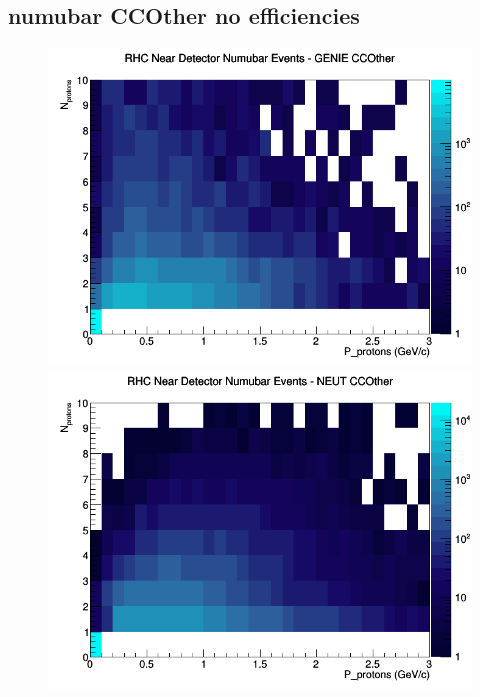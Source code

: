 \subsection{numubar CCOther no efficiencies}
\begin{figure}[h]
\includegraphics[width=\linewidth]{N_P/nominal/protons/CCOther_RHC_ND_numubar_N_P_GENIE.png}
\endminipage
{}
\includegraphics[width=\linewidth]{N_P/nominal/protons/CCOther_RHC_ND_numubar_N_P_NEUT.png}
\endminipage
{}

\end{figure}
